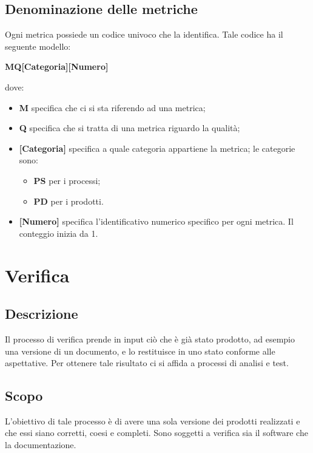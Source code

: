 \subsection{Denominazione delle metriche} \label{ProcessiDiSupportoGestioneDellaQualitàDenominazioneDelleMetriche}
Ogni metrica possiede un codice univoco che la identifica. Tale codice ha il seguente modello:
\begin{center}
	\textbf {MQ[Categoria][Numero]}
\end{center}
dove:
\begin{itemize}
	 \item \textbf {M} specifica che ci si sta riferendo ad una metrica;
	 \item \textbf {Q} specifica che si tratta di una metrica riguardo la qualità;
	 \item \textbf {[Categoria]} specifica a quale categoria appartiene la metrica; le categorie sono:
	 \begin{itemize}
		 \item \textbf{PS} per i processi;
		 \item \textbf{PD} per i prodotti.
	 \end{itemize}
	\item \textbf {[Numero]} specifica l’identificativo numerico specifico per ogni metrica. Il conteggio inizia da 1.
\end{itemize}

\section{Verifica}\label{ProcessiDiSupportoVerifica}

\subsection{Descrizione}\label{ProcessiDiSupportoVerificaDescrizione}
Il processo di verifica prende in input ciò che è già stato prodotto, ad esempio una versione di un documento, e lo restituisce in uno stato conforme alle aspettative. Per ottenere tale risultato ci si affida a processi di analisi e test.

\subsection{Scopo}\label{ProcessiDiSupportoVerificaScopo}
L'obiettivo di tale processo è di avere una sola versione dei prodotti realizzati e che essi siano corretti, coesi e
completi. Sono soggetti a verifica sia il software che la documentazione.

